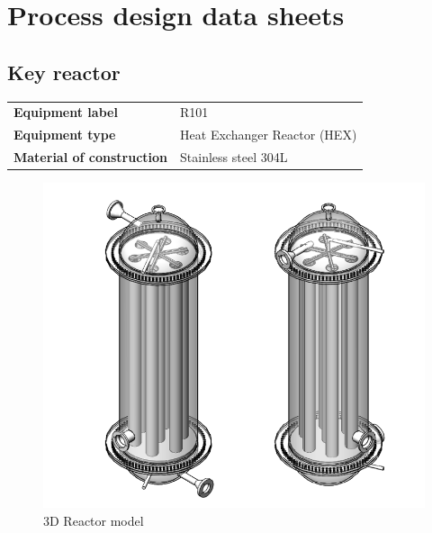 \section{Process design data sheets}

\subsection{Key reactor}
\begin{table}[H]
    \centering
    \begin{tabular}{@{}l|l@{}}
    \toprule
      \textbf{Equipment label}  & R101\\
       \textbf{Equipment type}  & Heat Exchanger Reactor (HEX) \\
       \textbf{Material of construction} & Stainless steel 304L \\
       \bottomrule
    \end{tabular}
\end{table}


\begin{figure}[H]
    \centering
    \includegraphics[width=0.7\linewidth]{chapters/2-reaction/figures/FYD reactor poster boy both.PNG}
    \caption{3D Reactor model}
\end{figure}

